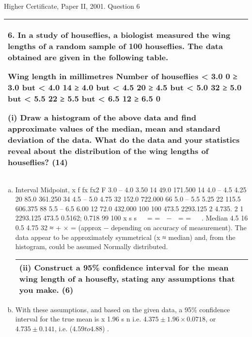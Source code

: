 \documentclass[a4paper,12pt]{article}
\begin{document}


Higher Certificate, Paper II, 2001. Question 6

\begin{table}[ht!]
 
\centering
 
\begin{tabular}{|p{15cm}|}
 
\hline  

6. In a study of houseflies, a biologist measured the wing lengths of a random sample of 100 houseflies.  The data obtained are given in the following table. 
 
Wing length in millimetres Number of houseflies < 3.0   0 ≥ 3.0 but < 4.0 14 ≥ 4.0 but < 4.5 20 ≥ 4.5 but < 5.0 32 ≥ 5.0 but < 5.5 22 ≥ 5.5 but < 6.5 12 ≥ 6.5   0 
 
(i) Draw a histogram of the above data and find approximate values of the median, mean and standard deviation of the data.  What do the data and your statistics reveal about the distribution of the wing lengths of houseflies? (14) 

\\ \hline
  
\end{tabular}

\end{table} 



\begin{enumerate}[(a)]
\item 
Interval Midpoint, x f fx fx2 F
3.0 – 4.0 3.50 14 49.0 171.500 14
4.0 – 4.5 4.25 20 85.0 361.250 34
4.5 – 5.0 4.75 32 152.0 722.000 66
5.0 – 5.5 5.25 22 115.5 606.375 88
5.5 – 6.5 6.00 12 72.0 432.000 100
100 473.5 2293.125
2
4.735. 2 1 2293.125 473.5 0.5162; 0.718
99 100
x s s
 
= =  −  = =
 
.
Median 4.5 16 0.5 4.75
32
≈ + × = (approx − depending on accuracy of measurement).
The data appear to be approximately symmetrical (x ≈ median) and, from the
histogram, could be assumed Normally distributed.

\begin{table}[ht!]
 
\centering
 
\begin{tabular}{|p{15cm}|}
 
\hline  
(ii) Construct a 95\% confidence interval for the mean wing length of a housefly, stating any assumptions that you make. (6) 
 
\\ \hline
  
\end{tabular}

\end{table} 
\item With these assumptions, and based on the given data, a 95\% confidence
interval for the true mean is x 1.96 s
n
\pm 
i.e. $4.375 \pm  1.96×0.0718$, or $4.735 \pm  0.141$, i.e. ($4.59 to 4.88$) .

\end{enumerate}
\end{document}
